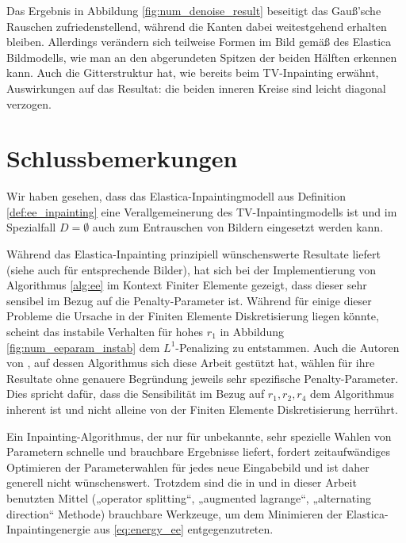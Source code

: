 \documentclass{mythesis}
\begin{document}
Das Ergebnis in Abbildung \ref{fig:num_denoise_result} beseitigt das Gauß'sche Rauschen zufriedenstellend, während die Kanten dabei weitestgehend erhalten bleiben.
Allerdings verändern sich teilweise Formen im Bild gemäß des Elastica Bildmodells, wie man an den abgerundeten Spitzen der beiden Hälften erkennen kann.
Auch die Gitterstruktur hat, wie bereits beim TV-Inpainting erwähnt, Auswirkungen auf das Resultat: die beiden inneren Kreise sind leicht diagonal verzogen.


\section{Schlussbemerkungen}


Wir haben gesehen, dass das Elastica-Inpaintingmodell aus Definition
\ref{def:ee_inpainting} eine Verallgemeinerung des TV-Inpaintingmodells ist und im
Spezialfall $D = \emptyset$ auch zum Entrauschen von Bildern eingesetzt werden
kann.

Während das Elastica-Inpainting prinzipiell wünschenswerte Resultate liefert (siehe auch \cite{shen2002euler,tai2011fast} für entsprechende Bilder),
hat sich bei der Implementierung von Algorithmus \ref{alg:ee} im Kontext Finiter Elemente gezeigt, dass dieser sehr sensibel im Bezug auf die Penalty-Parameter ist.
Während für einige dieser Probleme die Ursache in der Finiten Elemente Diskretisierung liegen könnte, scheint das instabile Verhalten für hohes $r_1$ in Abbildung \ref{fig:num_eeparam_instab} dem $L^1$-Penalizing zu entstammen.
Auch die Autoren von \cite{tai2011fast}, auf dessen Algorithmus sich diese Arbeit gestützt hat, wählen für ihre Resultate ohne genauere Begründung jeweils sehr spezifische Penalty-Parameter.
Dies spricht dafür, dass die Sensibilität im Bezug auf $r_1, r_2, r_4$ dem Algorithmus inherent ist und nicht alleine von der Finiten Elemente Diskretisierung herrührt.

Ein Inpainting-Algorithmus, der nur für unbekannte, sehr spezielle Wahlen von Parametern schnelle und brauchbare Ergebnisse liefert, fordert zeitaufwändiges Optimieren der Parameterwahlen für jedes neue Eingabebild und ist daher generell nicht wünschenswert.
Trotzdem sind die in \cite{tai2011fast} und in dieser Arbeit benutzten Mittel („operator splitting“, „augmented lagrange“, „alternating direction“ Methode) brauchbare Werkzeuge, um dem Minimieren der Elastica-Inpaintingenergie aus \eqref{eq:energy_ee} entgegenzutreten.
\end{document}
